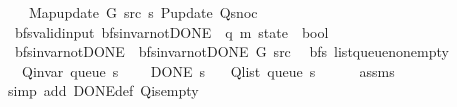 \begin{isabellebody}
\ \ \ \ Map{\isacharunderscore}{\kern0pt}update\ G\ src\ s\ P{\isacharunderscore}{\kern0pt}update\ Q{\isacharunderscore}{\kern0pt}snoc{\isachardoublequoteclose}\isanewline
\isanewline
{}\isamarkupfalse%
\ {\isacharparenleft}{\kern0pt}\ bfs{\isacharunderscore}{\kern0pt}valid{\isacharunderscore}{\kern0pt}input{\isacharparenright}{\kern0pt}\ bfs{\isacharunderscore}{\kern0pt}invar{\isacharunderscore}{\kern0pt}not{\isacharunderscore}{\kern0pt}DONE{\isacharprime}{\kern0pt}{\isacharprime}{\kern0pt}\ {\isacharcolon}{\kern0pt}{\isacharcolon}{\kern0pt}\ {\isachardoublequoteopen}{\isacharparenleft}{\kern0pt}{\isacharprime}{\kern0pt}q{\isacharcomma}{\kern0pt}\ {\isacharprime}{\kern0pt}m{\isacharparenright}{\kern0pt}\ state\ {\isasymRightarrow}\ bool{\isachardoublequoteclose}\ \isanewline
\ \ {\isachardoublequoteopen}bfs{\isacharunderscore}{\kern0pt}invar{\isacharunderscore}{\kern0pt}not{\isacharunderscore}{\kern0pt}DONE{\isacharprime}{\kern0pt}{\isacharprime}{\kern0pt}\ {\isasymequiv}\ bfs{\isacharunderscore}{\kern0pt}invar{\isacharunderscore}{\kern0pt}not{\isacharunderscore}{\kern0pt}DONE{\isacharprime}{\kern0pt}\ G\ src{\isachardoublequoteclose}\isanewline
\isanewline
{}\isamarkupfalse%
\ {\isacharparenleft}{\kern0pt}\ bfs{\isacharparenright}{\kern0pt}\ list{\isacharunderscore}{\kern0pt}queue{\isacharunderscore}{\kern0pt}non{\isacharunderscore}{\kern0pt}empty{\isacharcolon}{\kern0pt}\isanewline
\ \ \ {\isachardoublequoteopen}Q{\isacharunderscore}{\kern0pt}invar\ {\isacharparenleft}{\kern0pt}queue\ s{\isacharparenright}{\kern0pt}{\isachardoublequoteclose}\isanewline
\ \ \ {\isachardoublequoteopen}{\isasymnot}\ DONE\ s{\isachardoublequoteclose}\isanewline
\ \ \ {\isachardoublequoteopen}Q{\isacharunderscore}{\kern0pt}list\ {\isacharparenleft}{\kern0pt}queue\ s{\isacharparenright}{\kern0pt}\ {\isasymnoteq}\ {\isacharbrackleft}{\kern0pt}{\isacharbrackright}{\kern0pt}{\isachardoublequoteclose}%
\endisataginvisible
{\isafoldinvisible}%
%
\isadeliminvisible
\isanewline
%
\endisadeliminvisible
%
\isadelimproof
\ \ %
\endisadelimproof
%
\isatagproof
{}\isamarkupfalse%
\ assms\isanewline
\ \ \isamarkupfalse%
\ {\isacharparenleft}{\kern0pt}simp\ add{\isacharcolon}{\kern0pt}\ DONE{\isacharunderscore}{\kern0pt}def\ Q{\isachardot}{\kern0pt}is{\isacharunderscore}{\kern0pt}empty{\isacharparenright}{\kern0pt}%
\endisatagproof
{\isafoldproof}%
%
\isadelimproof
\isanewline
%
\endisadelimproof
%
\isadeliminvisible

\end{isabellebody}
